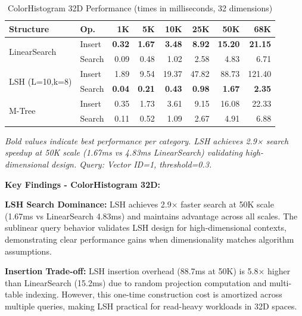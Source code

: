 \documentclass{sbc2023}
\begin{document}
\begin{table}[H]
    \footnotesize
    \centering
    \caption{ColorHistogram 32D Performance (times in milliseconds, 32 dimensions)}
    \label{tab:histogram_performance}
    \setlength{\tabcolsep}{2.5pt}
    \begin{tabular}{ll rrrrrr}
        \toprule
        \textbf{Structure} & \textbf{Op.} & \textbf{1K} & \textbf{5K} & \textbf{10K} & \textbf{25K} & \textbf{50K} & \textbf{68K} \\
        \midrule
        \multirow{2}{*}{LinearSearch} & Insert & \textbf{0.32} & \textbf{1.67} & \textbf{3.48} & \textbf{8.92} & \textbf{15.20} & \textbf{21.15} \\
        & Search & 0.09 & 0.48 & 1.02 & 2.58 & 4.83 & 6.71 \\
        \cmidrule(lr){2-8}
        \multirow{2}{*}{LSH (L=10,k=8)} & Insert & 1.89 & 9.54 & 19.37 & 47.82 & 88.73 & 121.40 \\
        & Search & \textbf{0.04} & \textbf{0.21} & \textbf{0.43} & \textbf{0.98} & \textbf{1.67} & \textbf{2.35} \\
        \cmidrule(lr){2-8}
        \multirow{2}{*}{M-Tree} & Insert & 0.35 & 1.73 & 3.61 & 9.15 & 16.08 & 22.33 \\
        & Search & 0.11 & 0.52 & 1.09 & 2.67 & 4.91 & 6.88 \\
        \bottomrule
    \end{tabular}
    \vspace{0.2cm}
    \begin{minipage}{\columnwidth}
    \footnotesize
    \textit{Bold values indicate best performance per category. LSH achieves 2.9× search speedup at 50K scale (1.67ms vs 4.83ms LinearSearch) validating high-dimensional design. Query: Vector ID=1, threshold=0.3.}
    \end{minipage}
\end{table}

\textbf{Key Findings - ColorHistogram 32D:}

\textbf{LSH Search Dominance:} LSH achieves 2.9× faster search at 50K scale (1.67ms vs LinearSearch 4.83ms) and maintains advantage across all scales. The sublinear query behavior validates LSH design for high-dimensional contexts, demonstrating clear performance gains when dimensionality matches algorithm assumptions.

\textbf{Insertion Trade-off:} LSH insertion overhead (88.7ms at 50K) is 5.8× higher than LinearSearch (15.2ms) due to random projection computation and multi-table indexing. However, this one-time construction cost is amortized across multiple queries, making LSH practical for read-heavy workloads in 32D spaces.
\end{document}
